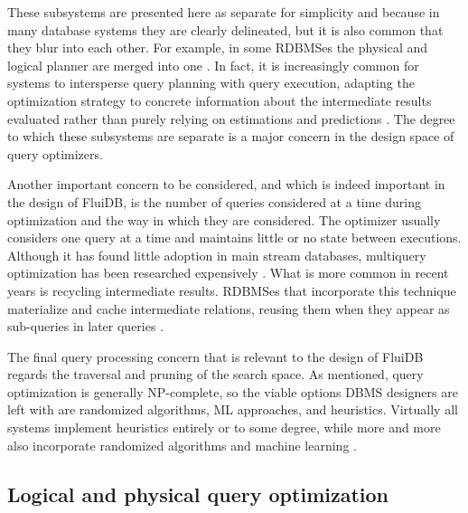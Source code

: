 These subsystems are presented here as separate for simplicity and
because in many database systems they are clearly delineated, but it is
also common that they blur into each other. For example, in some RDBMSes
the physical and logical planner are merged into one
\cite{graefeCascadesFrameworkQuery1995,shankarQueryOptimizationMicrosoft2012,solimanOrcaModularQuery2014}. In
fact, it is increasingly common for systems to intersperse query
planning with query execution, adapting the optimization strategy
\cite{graefeDynamicQueryEvaluation1989} to concrete information about
the intermediate results evaluated rather than purely relying on
estimations and predictions
\cite{dingPlanStitchHarnessing2018,chaudhuriPayasyougoFrameworkQuery2008,wuSamplingbasedQueryReoptimization2016,herodotouXplusSqltuningawareQuery2010}. The
degree to which these subsystems are separate is a major concern in
the design space of query optimizers.

Another important concern to be considered, and which is indeed
important in the design of FluiDB, is the number of queries considered
at a time during optimization and the way in which they are
considered. The optimizer usually considers one query at a time and
maintains little or no state between executions. Although it has found
little adoption in main stream databases, multiquery optimization has
been researched expensively
\cite{michiardiCachebasedMultiqueryOptimization2021,wangMultiqueryOptimizationMapreduce2013,royEfficientExtensibleAlgorithms2000,rogersMultiqueryOptimization2017}. What
is more common in recent years is recycling intermediate
results. RDBMSes that incorporate this technique materialize and cache
intermediate relations, reusing them when they appear as sub-queries in
later queries
\cite{perezHistoryawareQueryOptimization2014,nagelRecyclingPipelinedQuery2013,ivanovaArchitectureRecyclingIntermediates2010}.

The final query processing concern that is relevant to the design of
FluiDB regards the traversal and pruning of the search space. As
mentioned, query optimization is generally NP-complete, so the viable
options DBMS designers are left with are randomized algorithms, ML
approaches, and heuristics. Virtually all systems implement heuristics
entirely or to some degree, while more and more also incorporate
randomized algorithms \cite{chandeGeneticOptimizationJoin2011} and
machine learning
\cite{liMachineLearningDatabases2021,marcusNeoLearnedQuery2019}.

\subsection{Logical and physical query optimization}

